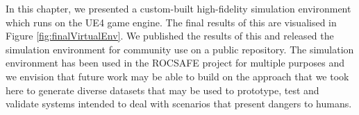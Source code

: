 In this chapter, we presented a custom-built high-fidelity simulation environment which runs on the UE4 game engine. The final results of this are visualised in Figure \ref{fig:finalVirtualEnv}. We published the results of this and released the simulation environment for community use on a public repository. The simulation environment has been used in the ROCSAFE project for multiple purposes and we envision that future work may be able to build on the approach that we took here to generate diverse datasets that may be used to prototype, test and validate systems intended to deal with scenarios that present dangers to humans.